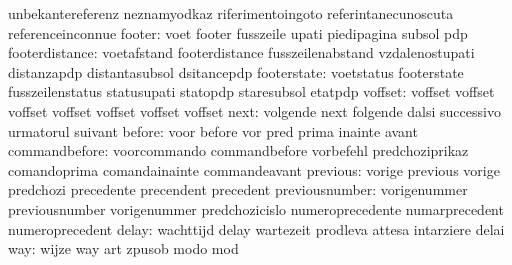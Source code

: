                            unbekantereferenz         neznamyodkaz
                           riferimentoingoto         referintanecunoscuta
                           referenceinconnue
                   footer: voet                      footer
                           fusszeile                 upati
                           piedipagina               subsol
                           pdp
           footerdistance: voetafstand               footerdistance
                           fusszeilenabstand         vzdalenostupati
                           distanzapdp               distantasubsol
                           dsitancepdp
              footerstate: voetstatus                footerstate
                           fusszeilenstatus          statusupati
                           statopdp                  staresubsol
                           etatpdp
                  voffset: voffset                   voffset
                           voffset                   voffset
                           voffset                   voffset
                           voffset
                     next: volgende                  next
                           folgende                  dalsi
                           successivo                urmatorul
                           suivant
                   before: voor                      before
                           vor                       pred
                           prima                     inainte
                           avant
            commandbefore: voorcommando              commandbefore
                           vorbefehl                 predchoziprikaz
                           comandoprima              comandainainte
                           commandeavant
                 previous: vorige                    previous
                           vorige                    predchozi
                           precedente                precendent
                           precedent
           previousnumber: vorigenummer              previousnumber
                           vorigenummer              predchozicislo
                           numeroprecedente          numarprecedent
                           numeroprecedent
                    delay: wachttijd                 delay
                           wartezeit                 prodleva
                           attesa                    intarziere
                           delai
                      way: wijze                     way
                           art                       zpusob
                           modo                      mod
